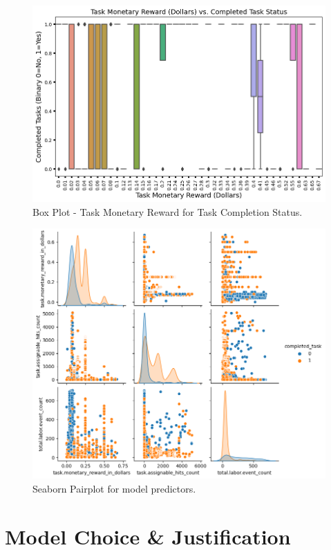 \documentclass[11pt]{article}
\begin{document}
\begin{figure}[hbt!]
  \centering
  \includegraphics[width=\linewidth]{figures/task-monetary_reward_in_dollars-vs-completed_task-boxplot}
  \caption{Box Plot - Task Monetary Reward for Task Completion Status.}
\end{figure}

\begin{figure}[hbt!]
  \centering
  \includegraphics[width=\linewidth]{figures/sns-pairplot}
  \caption{Seaborn Pairplot for model predictors.}
\end{figure}


\section{Model Choice \& Justification}
\end{document}
